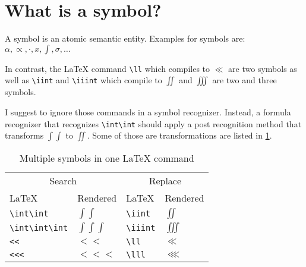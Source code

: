 \section{What is a symbol?}
A symbol is an atomic semantic entity. Examples for symbols are: $\alpha, \propto, \cdot, x, \int, \sigma, \dots$

In contrast, the \LaTeX{} command \verb+\ll+ which compiles to $\ll$ are two
symbols as well as \verb+\iint+ and \verb+\iiint+ which compile to $\iint$ and
$\iiint$ are two and three symbols. 

I suggest to ignore those commands in a symbol recognizer. Instead, a formula
recognizer that recognizes \verb+\int\int+ should apply a post recognition method
that transforms $\int\int$ to $\iint$. Some of those are transformations are
listed in \cref{table:postprocessing-formula-recognizer}.

\begin{table}[ht]
    \centering
    \begin{tabular}{ll|ll}
        \toprule
        \multicolumn{2}{c|}{Search}           & \multicolumn{2}{c}{Replace} \\
        \LaTeX{}            & Rendered       & \LaTeX{}      & Rendered \\\midrule
        \verb+\int\int+     & $\int\int$     & \verb+\iint+  & $\iint$ \\
        \verb+\int\int\int+ & $\int\int\int$ & \verb+\iiint+ & $\iiint$ \\
        \verb+<<+           & $<<$           & \verb+\ll+    & $\ll$ \\
        \verb+<<<+          & $<<<$          & \verb+\lll+   & $\lll$ \\
        \bottomrule
    \end{tabular}
    \caption{Multiple symbols in one \LaTeX{} command}
    \label{table:postprocessing-formula-recognizer}
\end{table}